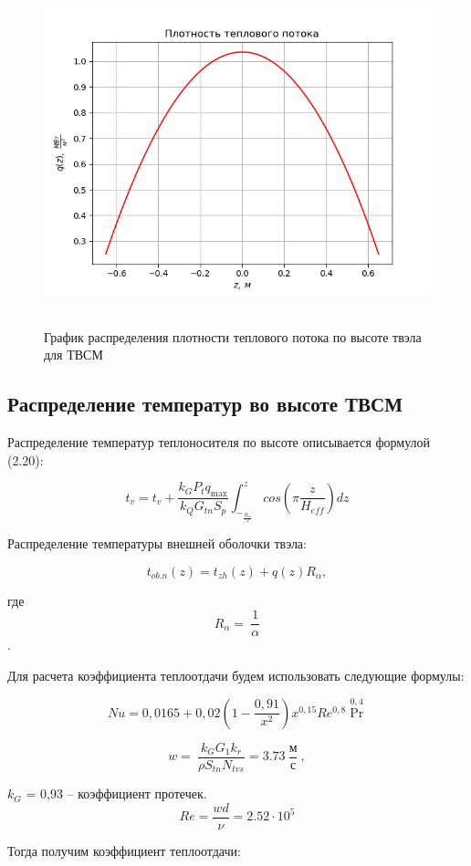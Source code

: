 \begin{figure}[!h]
\center
\includegraphics[height=10cm]{media/image9.png}
\caption{График распределения плотности теплового потока по высоте
твэла для ТВСМ}
\end{figure}

\subsection{Распределение температур во высоте ТВСМ}

Распределение температур теплоносителя по высоте описывается формулой
(2.20):

\[t_{v} = t_{v} + \frac{k_{G}P_{t}q_{\max}}{k_{Q}G_{tn}S_{p}}\int_{-_{\frac{H_{az}}{2}}}^{z}{cos\left( \pi\frac{z}{H_{eff}} \right)dz}\]

Распределение температуры внешней оболочки твэла:

\[t_{ob.n}\left( z \right) = t_{zh}\left( z \right) + q\left( z \right)R_{\alpha},\]

где \[R_{\alpha} = \ \frac{1}{\alpha}\] .

Для расчета коэффициента теплоотдачи будем использовать следующие
формулы:

\[Nu =  0,0165 + 0,02\left( 1 - \frac{0,91}{x^{2}} \right)x^{0,15} Re^{0,8}\Pr^{0,4}\]

\[w = \ \frac{k_{G}G_{1}k_{r}}{\rho S_{tn}N_{tvs}} = 3.73\ \frac{\textrm{м}}{\textrm{с}}\ ,\]

\flushleft $k_{G}$ = 0,93 \textrm{ -- коэффициент протечек.}
\[Re = \frac{wd}{\nu} = 2.52 \cdot 10^{5}\]

Тогда получим коэффициент теплоотдачи:

